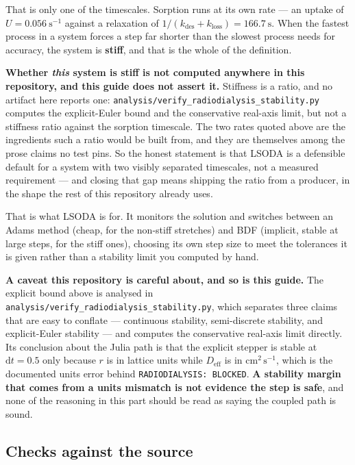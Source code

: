 \documentclass[11pt]{article}
\begin{document}
That is only one of the timescales. Sorption runs at its own rate — an uptake of
$U = 0.056\ \mathrm{s^{-1}}$ against a relaxation of
$1/(k_{\text{des}} + k_{\text{loss}}) = 166.7\ \mathrm{s}$. When the fastest process in a
system forces a step far shorter than the slowest process needs for accuracy, the system is
\textbf{stiff}, and that is the whole of the definition.

\textbf{Whether \emph{this} system is stiff is not computed anywhere in this repository, and
this guide does not assert it.} Stiffness is a ratio, and no artifact here reports one:
\texttt{analysis/verify\_radiodialysis\_stability.py} computes the explicit-Euler bound and
the conservative real-axis limit, but not a stiffness ratio against the sorption timescale.
The two rates quoted above are the ingredients such a ratio would be built from, and they are
themselves among the prose claims no test pins. So the honest statement is that LSODA is a
defensible default for a system with two visibly separated timescales, not a measured
requirement — and closing that gap means shipping the ratio from a producer, in the shape the
rest of this repository already uses.

That is what LSODA is for. It monitors the solution and switches between an Adams
method (cheap, for the non-stiff stretches) and BDF (implicit, stable at large steps, for the
stiff ones), choosing its own step size to meet the tolerances it is given rather than a
stability limit you computed by hand.

\textbf{A caveat this repository is careful about, and so is this guide.} The explicit bound
above is analysed in \texttt{analysis/verify\_radiodialysis\_stability.py}, which separates
three claims that are easy to conflate — continuous stability, semi-discrete stability, and
explicit-Euler stability — and computes the conservative real-axis limit directly. Its
conclusion about the Julia path is that the explicit stepper is stable at
$\mathrm{d}t = 0.5$ only because $r$ is in lattice units while $D_{\text{eff}}$ is in
$\mathrm{cm^2\,s^{-1}}$, which is the documented units error behind
\texttt{RADIODIALYSIS: BLOCKED}. \textbf{A stability margin that comes from a units mismatch
is not evidence the step is safe}, and none of the reasoning in this part should be read as
saying the coupled path is sound.

\subsection*{Checks against the source}
\end{document}
